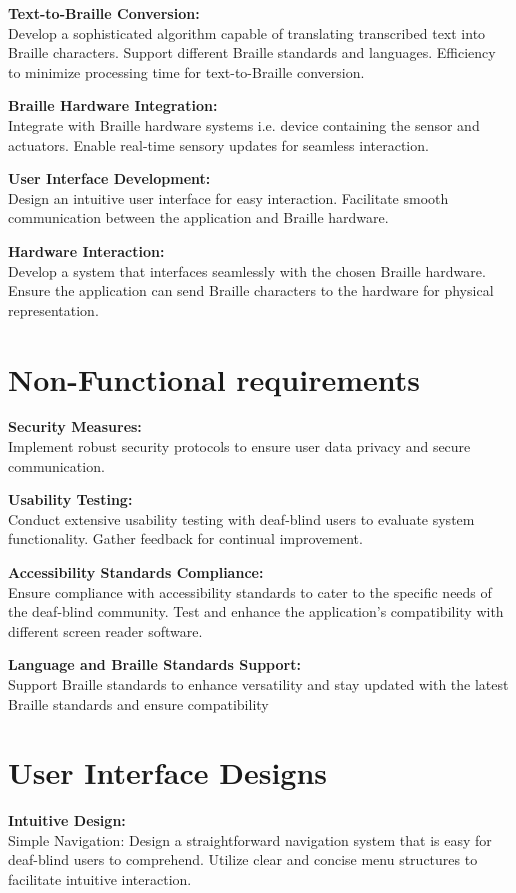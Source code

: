 \documentclass[12pt,a4paper]{report}
\begin{document}
 \noindent\textbf{Text-to-Braille Conversion:}\\
  Develop a sophisticated algorithm capable of translating transcribed text into Braille characters. Support different Braille standards and languages. Efficiency to minimize processing time for text-to-Braille conversion.

 \noindent\textbf{Braille Hardware Integration:}\\
  Integrate with Braille hardware systems i.e. device containing the sensor and actuators. Enable real-time sensory updates for seamless interaction.

 \noindent\textbf{User Interface Development:}\\
  Design an intuitive user interface for easy interaction.
  Facilitate smooth communication between the application and Braille hardware.

 \noindent\textbf{Hardware Interaction:}\\
  Develop a system that interfaces seamlessly with the chosen Braille hardware.
  Ensure the application can send Braille characters to the hardware for physical representation.
  
\section{Non-Functional requirements}
\textbf{Security Measures:}\\
Implement robust security protocols to ensure user data privacy and secure communication.

\noindent\textbf{Usability Testing:}\\
Conduct extensive usability testing with deaf-blind users to evaluate system functionality. Gather feedback for continual improvement.

\noindent\textbf{Accessibility Standards Compliance:}\\
Ensure compliance with accessibility standards to cater to the specific needs of the deaf-blind community. Test and enhance the application's compatibility with different screen reader software.

\noindent\textbf{Language and Braille Standards Support:}\\
Support Braille standards to enhance versatility and stay updated with the latest Braille standards and ensure compatibility

\section{User Interface Designs}
\textbf{Intuitive Design:}\\
\qquad Simple Navigation:
Design a straightforward navigation system that is easy for deaf-blind users to comprehend. Utilize clear and concise menu structures to facilitate intuitive interaction.
\end{document}
